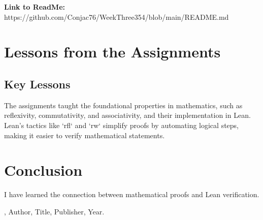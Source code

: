 \documentclass{article}
\theoremstyle{theorem}
\theoremstyle{definition}
\theoremstyle{remark}
\begin{document}
\textbf{Link to ReadMe:}
https://github.com/Conjac76/WeekThree354/blob/main/README.md


\section{Lessons from the Assignments}

\subsection{Key Lessons}

The assignments taught the foundational properties in mathematics, such as reflexivity, commutativity, and associativity, and their implementation in Lean. Lean's tactics like `rfl` and `rw` simplify proofs by automating logical steps, making it easier to verify mathematical statements. 

\section{Conclusion}\label{conclusion}

I have learned the connection between mathematical proofs and Lean verification. 

\begin{thebibliography}{99}
\bibitem[BLA], Author, Title, Publisher, Year.
\end{thebibliography}
\end{document}
